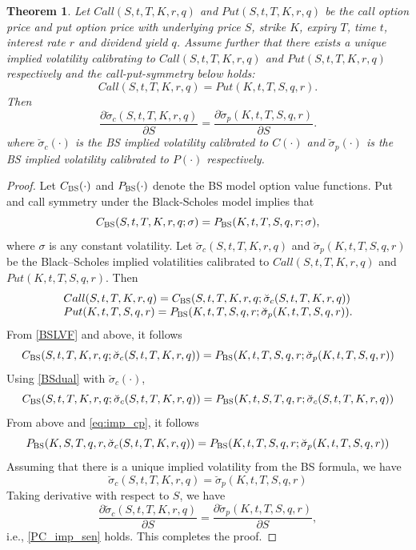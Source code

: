 \documentclass[letterpaper,12pt,titlepage,oneside,final]{book}
\numberwithin{equation}{section}
\newtheorem{thm}{Theorem}[section]
\theoremstyle{definition}
\newcommand{\impsigma}{\breve{\sigma}}
\newcommand{\BS}{\textsc{BS}}
\begin{document}
\begin{thm}\label{pc:symmetry}
Let $Call(S,t,T,K,r,q)$ and $Put(S,t,T,K,r,q)$ be the call option price and put option price with underlying price $S$, strike $K$, expiry $T$, time $t$, interest rate $r$ and dividend yield $q$.
Assume further that there exists a unique implied volatility calibrating to  $Call(S,t,T,K,r,q)$ and $Put(S,t,T,K,r,q)$  respectively and the call-put-symmetry below holds:
\begin{equation} \label{BSLVF}
Call(S, t,T,K,r, q)=Put(K, t,T,S , q, r).
\end{equation}
Then
\begin{equation}\label{PC_imp_sen}
\frac{\partial \impsigma_c(S, t,T,K, r, q)}{\partial S} =\frac{\partial \impsigma_p(K, t,T,S , q, r)}{\partial S}.
\end{equation}
where $\impsigma_c(\cdot)$ is the BS implied volatility calibrated to $C(\cdot)$ and $\impsigma_p(\cdot)$ is the BS implied volatility calibrated to $P(\cdot)$
respectively.
\end{thm}

\begin{proof}
Let $C_{\BS}(\cdot)$ and $P_{\BS}(\cdot)$  denote the BS model option value functions. Put and call symmetry under the Black-Scholes model implies that
\begin{equation}\label{BSdual}
C_{\BS}(S,t,T,K, r, q;\sigma )=P_{\BS}(K,t,T,S, q, r;\sigma),
\end{equation}
where $\sigma$ is any constant volatility.
Let $\impsigma_c(S, t,T,K, r, q)$ and $\impsigma_p(K, t,T,S , q, r)$ be the Black–Scholes implied volatilities calibrated to $Call(S,t,T,K, r, q)$ and $Put(K,t,T,S, q, r)$.
Then
\begin{equation}
\begin{array}{l}
    Call(S,t,T,K, r, q)=C_{\BS}(S,t,T,K, r, q;\impsigma_c(S, t,T,K, r, q) )\\
    Put(K,t,T,S, q, r)=P_{\BS}(K,t,T,S, q, r;\impsigma_p(K, t,T,S , q, r)).
\end{array}
\end{equation}
From \eqref{BSLVF} and above, it follows
\begin{equation}\label{eq:imp_cp}
    C_{\BS}(S,t,T,K, r, q;\impsigma_c(S, t,T,K, r, q) )=P_{\BS}(K,t,T,S, q, r;\impsigma_p(K, t,T,S , q, r))
\end{equation}
Using \eqref{BSdual} with $\impsigma_c(\cdot)$,
$$
C_{\BS}(S,t,T,K, r, q;\impsigma_c(S, t,T,K, r, q) )=P_{\BS}(K, t, S, T, q, r;\impsigma_c(S, t,T,K, r, q))
$$
From above and \eqref{eq:imp_cp}, it follows
$$
P_{\BS}(K, S, T, q, r,\impsigma_c(S, t,T,K, r, q))= P_{\BS}(K,t,T,S, q, r;\impsigma_p(K, t,T,S , q, r))
$$
Assuming that there is a unique implied volatility from the BS formula, we have
\begin{equation}
    \impsigma_c(S, t,T,K, r, q)=\impsigma_p(K, t,T,S , q, r)
\end{equation}
Taking derivative with respect to $S$, we have
$$
\frac{\partial \impsigma_c(S, t,T,K, r, q)}{\partial S} =\frac{\partial \impsigma_p(K, t,T,S , q, r)}{\partial S},
$$
i.e., \eqref{PC_imp_sen} holds.
This completes the proof.
\end{proof}
\end{document}
